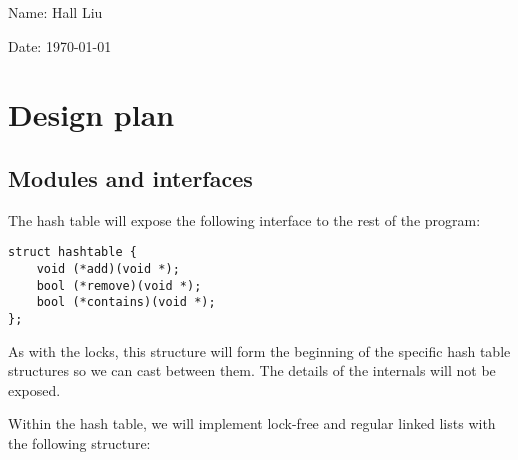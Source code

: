 \documentclass{article}
\begin{document}
Name: Hall Liu

Date: \today 
\vspace{1.5cm}

\section*{Design plan}
\subsection*{Modules and interfaces}
The hash table will expose the following interface to the rest of the program:
\begin{verbatim}
struct hashtable {
    void (*add)(void *);
    bool (*remove)(void *);
    bool (*contains)(void *);
};
\end{verbatim}
As with the locks, this structure will form the beginning of the specific hash table structures so we can cast between them. The details of the internals will not be exposed.

Within the hash table, we will implement lock-free and regular linked lists with the following structure:
\end{document}
